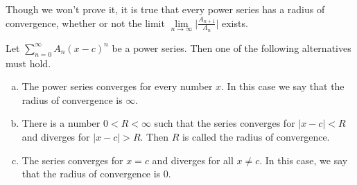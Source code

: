 Though we won't prove it, it is true that every power series has a
radius of convergence, whether or not the limit
$\lim\limits_{n\rightarrow\infty}\Big|\frac{A_{n+1}}{A_n}\Big|$  exists.

\begin{theorem}\label{thm:SRradiusofconvergence}
Let $\sum\limits_{n=0}^\infty A_n (x-c)^n$ be a power series. Then one of the
following alternatives must hold.
\begin{enumerate}[(a)]
\item The power series converges for every number $x$. In this case we say that
the radius of convergence is $\infty$.
\item There is a number $0<R<\infty$ such that the series converges
for $|x-c|<R$ and diverges for $|x-c|>R$. Then $R$ is called the radius
of convergence.
\item The series converges for $x=c$ and diverges for all $x\ne c$.
In this case, we say that the radius of convergence is $0$.
\end{enumerate}
\end{theorem}

